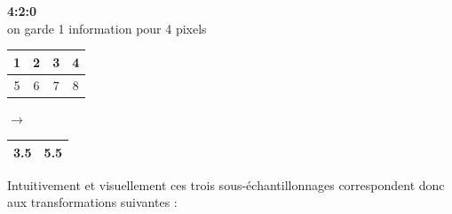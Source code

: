 \documentclass{article}
\begin{document}
\begin{minipage}[t]{0.45\textwidth}
    \centering
    \textbf{4:2:0}
    \\on garde 1 information pour 4 pixels
\end{minipage}
\hfill
\begin{minipage}[t]{0.5\textwidth}
  \begin{tabular}{|c|c|c|c|}
    \hline
    1 & 2 & 3 & 4 \\
    \hline
    5 & 6 & 7 & 8 \\
    \hline
  \end{tabular}
    $ \rightarrow $
  \begin{tabular}{|c|c|}
    \hline
    3.5 & 5.5 \\
    \hline
  \end{tabular}
\end{minipage}

\vspace{.6cm}

Intuitivement et visuellement ces trois sous-échantillonnages correspondent donc aux transformations suivantes :
\end{document}
